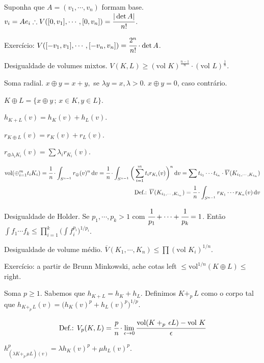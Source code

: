 \documentclass[12pt]{article}
\begin{document}
Suponha que $A = (v_1,\cdots, v_n)$ formam base. $v_i = Ae_i \therefore V([0, v_1], \cdots, [0, v_n]) = \cfrac{|\det A|}{n!}$.

Exerc\'icio: $V([-v_1, v_1], \cdots, [-v_n, v_n]) = \cfrac{2^n}{n!}\cdot\det A$.

Desigualdade de volumes mixtos. $V(K,L) \ge (\text{vol }K)^{\frac{n-1}{n}}\cdot (\text{vol }L)^{\frac{1}{n}}$.

Soma radial. $x \oplus y = x + y,$ se $\lambda y = x, \lambda > 0$. $x \oplus y = 0$, caso contr\'ario.

$K \oplus L = \{ x \oplus y\,;\,x\in K,y\in L \}$.

$h_{K + L}(v) = h_K(v) + h_L(v)$.

$r_{K \oplus L}(v) = r_K(v) + r_L(v)$.

$r_{\oplus \lambda_i K_i}(v) = \sum \lambda_i r_{K_i}(v)$.

\begin{align}
\text{vol}(\oplus_{i = 1}^m t_i K_i) = \cfrac{1}{n}\cdot \int_{S^{n - 1}} r_{\oplus}(v)^n\,\mathrm{d}v = \cfrac{1}{n}\cdot \int_{S^{n - 1}} \bigg( \sum_{i = 1}^m t_i r_{K_i}(v) \bigg)^n\,\mathrm{d}v = \sum t_{i_1} \cdots t_{i_n} \cdot \overline{V}(K_{i_1, \cdots, K_{i_n}}) \\
\text{Def.: }\overline{V}(K_{i_1, \cdots, K_{i_n}}) = \cfrac{1}{n}\cdot \int_{S^{n - 1}} r_{K_1}\cdots r_{K_n}(v)\,\mathrm{d}v
\end{align}

Desigualdade de Holder. Se $p_1, \cdots, p_k > 1$ com $\cfrac{1}{p_1} + \cdots + \cfrac{1}{p_k} = 1$. Ent\~ao $\int f_1 \cdots f_k \le \prod_{i = 1}^k \bigg( \int f_i^{p_i} \bigg)^{1/p_i}$.

Desigualdade de volume m\'edio. $\overline{V}(K_1, \cdots, K_n) \le \prod (\text{vol }K_i)^{1/n}$.

Exerc\'icio: a partir de Brunn Minkowski, ache cotas left $\le \text{vol}^{1/n}(K \oplus L) \le $ right.

Soma $p \ge 1$. Sabemos que $h_{K + L} = h_K + h_L$. Definimos $K +_p\,L$ como o corpo tal que $h_{K +_p\,L}(v) = \bigg( h_K(v)^p + h_L(v)^p \bigg)^{1/p}$.

\begin{align}
\text{Def.: }V_p(K, L) = \cfrac{p}{n}\cdot \lim_{\epsilon \to 0} \cfrac{\text{vol}(K +_p\,\epsilon L) - \text{vol }K}{\epsilon}
\end{align}

$h_{(\lambda K +_p\,\mu L)(v)}^p = \lambda h_K(v)^p + \mu h_L(v)^p$.
\end{document}
